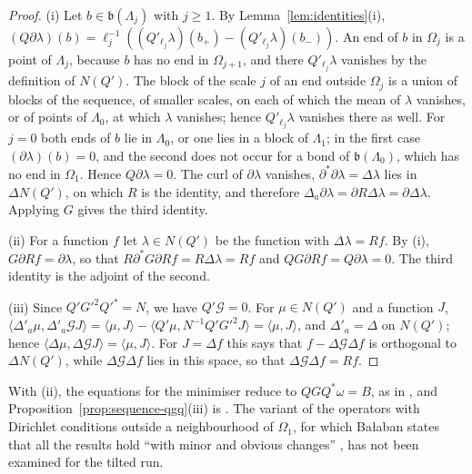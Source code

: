 \documentclass[11pt]{preprint}
\numberwithin{equation}{section}
\theoremstyle{definition}
\theoremstyle{remark}
\theoremstyle{plain}
\begin{document}
\begin{proof}
(i) Let $b \in \mathfrak b(\Lambda_j)$ with $j \geq 1$. By Lemma~\ref{lem:identities}(i), $(Q\partial\lambda)(b) = \ell_j^{-1}((Q'_{\ell_j}\lambda)(b_+) - (Q'_{\ell_j}\lambda)(b_-))$. An end of $b$ in $\Omega_j$ is a point of $\Lambda_j$, because $b$ has no end in $\Omega_{j+1}$, and there $Q'_{\ell_j}\lambda$ vanishes by the definition of $N(Q')$. The block of the scale $j$ of an end outside $\Omega_j$ is a union of blocks of the sequence, of smaller scales, on each of which the mean of $\lambda$ vanishes, or of points of $\Lambda_0$, at which $\lambda$ vanishes; hence $Q'_{\ell_j}\lambda$ vanishes there as well. For $j = 0$ both ends of $b$ lie in $\Lambda_0$, or one lies in a block of $\Lambda_1$; in the first case $(\partial\lambda)(b) = 0$, and the second does not occur for a bond of $\mathfrak b(\Lambda_0)$, which has no end in $\Omega_1$. Hence $Q\partial\lambda = 0$. The curl of $\partial\lambda$ vanishes, $\partial^*\partial\lambda = \Delta\lambda$ lies in $\Delta N(Q')$, on which $R$ is the identity, and therefore $\Delta_a\partial\lambda = \partial R\Delta\lambda = \partial\Delta\lambda$. Applying $G$ gives the third identity.

(ii) For a function $f$ let $\lambda \in N(Q')$ be the function with $\Delta\lambda = Rf$. By (i), $G\partial Rf = \partial\lambda$, so that $R\partial^*G\partial Rf = R\Delta\lambda = Rf$ and $QG\partial Rf = Q\partial\lambda = 0$. The third identity is the adjoint of the second.

(iii) Since $Q'G'^2Q'^* = N$, we have $Q'\mathscr G = 0$. For $\mu \in N(Q')$ and a function $J$, $\langle\Delta'_a\mu, \Delta'_a\mathscr GJ\rangle = \langle\mu, J\rangle - \langle Q'\mu, N^{-1}Q'G'^2J\rangle = \langle\mu, J\rangle$, and $\Delta'_a = \Delta$ on $N(Q')$; hence $\langle\Delta\mu, \Delta\mathscr GJ\rangle = \langle\mu, J\rangle$. For $J = \Delta f$ this says that $f - \Delta\mathscr G\Delta f$ is orthogonal to $\Delta N(Q')$, while $\Delta\mathscr G\Delta f$ lies in this space, so that $\Delta\mathscr G\Delta f = Rf$.
\end{proof}

With (ii), the equations \cite[(2.23)]{BalabanPRT2} for the minimiser reduce to $QGQ^*\omega = B$, as in \cite[p.~228]{BalabanPRT2}, and Proposition~\ref{prop:sequence-qgq}(iii) is \cite[(2.35)]{BalabanPRT2}. The variant of the operators with Dirichlet conditions outside a neighbourhood of $\Omega_1$, for which Ba{\l}aban states that all the results hold ``with minor and obvious changes'' \cite[p.~228]{BalabanPRT2}, has not been examined for the tilted run.
\end{document}
